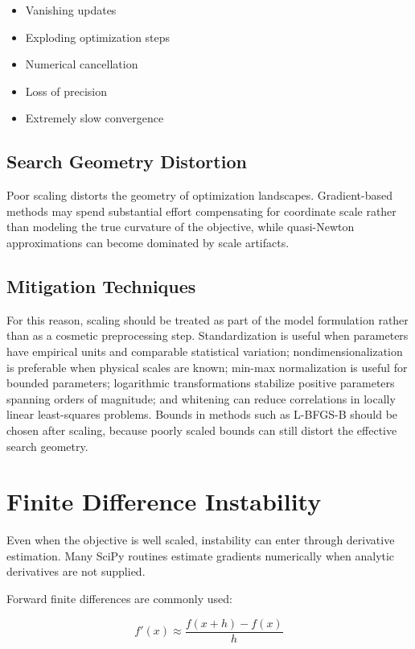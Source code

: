 \begin{itemize}
    \item Vanishing updates
    \item Exploding optimization steps
    \item Numerical cancellation
    \item Loss of precision
    \item Extremely slow convergence
\end{itemize}

\subsection{Search Geometry Distortion}

Poor scaling distorts the geometry of optimization landscapes. Gradient-based methods may spend substantial effort compensating for coordinate scale rather than modeling the true curvature of the objective, while quasi-Newton approximations can become dominated by scale artifacts.

\subsection{Mitigation Techniques}

For this reason, scaling should be treated as part of the model formulation rather than as a cosmetic preprocessing step. Standardization is useful when parameters have empirical units and comparable statistical variation; nondimensionalization is preferable when physical scales are known; min-max normalization is useful for bounded parameters; logarithmic transformations stabilize positive parameters spanning orders of magnitude; and whitening can reduce correlations in locally linear least-squares problems. Bounds in methods such as L-BFGS-B should be chosen after scaling, because poorly scaled bounds can still distort the effective search geometry.

\section{Finite Difference Instability}

Even when the objective is well scaled, instability can enter through derivative estimation. Many SciPy routines estimate gradients numerically when analytic derivatives are not supplied.

Forward finite differences are commonly used:

\begin{equation}
f'(x) \approx \frac{f(x+h)-f(x)}{h}
\end{equation}


